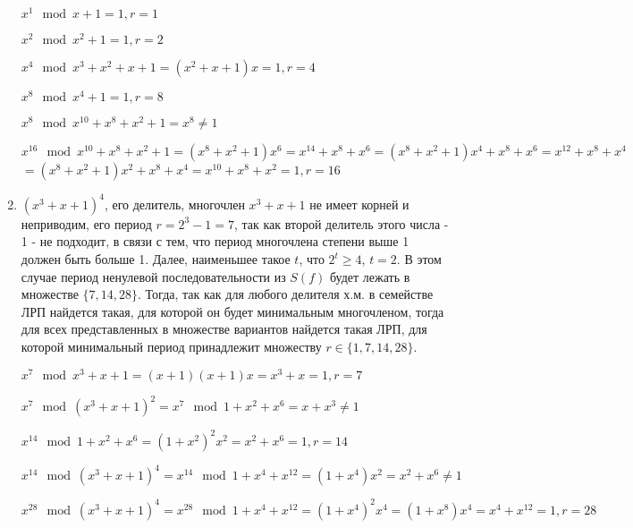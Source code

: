\documentclass[utf8x, 14pt]{G7-32} %
\begin{document}
\begin{enumerate}
    $x^1 \mod x+1 = 1, r = 1$
    
    $x^2 \mod x^2+1 = 1, r = 2$
    
    $x^4 \mod x^3 + x^2 + x +1 = (x^2 + x + 1) x = 1, r = 4$
    
    $x^8 \mod x^4+1 = 1, r = 8$
    
    $x^8 \mod x^{10} +x^8 + x^2 + 1 = x^8 \neq 1$
    
    $x^{16} \mod x^{10} +x^8 + x^2 + 1  = (x^8 + x^2 + 1) x^6 = x^{14} + x^8 + x^6 = (x^8 + x^2 + 1) x^4 + x^8 + x^6 = x^{12} + x^8 + x^4$
    $ = (x^8 + x^2 + 1) x^2 + x^8 + x^4 = x^{10} + x^8 + x^2 = 1, r = 16$
    
    \item $(x^3+x+1)^4$, его делитель, многочлен $x^3+x+1$ не имеет корней и неприводим, его период $r = 2^3 -1 = 7$, так как второй делитель этого числа - 1 - не подходит, в связи с тем, что период многочлена степени выше 1 должен быть больше 1. Далее, наименьшее такое $t$, что $2^t \geq 4$, $t=2$. В этом случае период ненулевой последовательности из $S(f)$ будет лежать в множестве $\{7, 14, 28\}$. Тогда, так как для любого делителя х.м. в семействе ЛРП найдется такая, для которой он будет минимальным многочленом, тогда для всех представленных в множестве вариантов найдется такая ЛРП, для которой минимальный период принадлежит множеству $r \in \{1, 7, 14, 28 \}$.
    
    $x^7 \mod x^3+x+1 = (x+1)(x+1)x = x^3 + x = 1, r = 7$
    
    $x^7 \mod (x^3+x+1)^2 = x^7 \mod 1+x^2+x^6 = x+x^3 \neq 1$
    
    $x^{14} \mod 1+x^2+x^6 = (1+x^2)^2 x^2 = x^2 + x^6 = 1, r = 14$
    
    $x^{14} \mod (x^3+x+1)^4 = x^{14} \mod 1 + x^4 + x^{12} = (1+x^4) x^2 = x^2 + x^6 \neq 1$
    
    $x^{28} \mod (x^3+x+1)^4 = x^{28} \mod 1 + x^4 + x^{12} = (1+x^4)^2 x^4 = (1 + x^8) x^4 = x^4 + x^{12} = 1, r = 28$
    

\end{enumerate}
\end{document}
